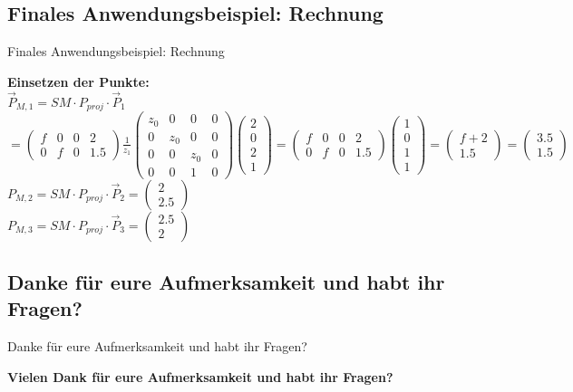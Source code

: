 \documentclass[10pt,aspectratio=169]{beamer}
\begin{document}
  \subsection{Finales Anwendungsbeispiel: Rechnung}
  \begin{frame}{Finales Anwendungsbeispiel: Rechnung}
    
      \textbf{Einsetzen der Punkte:}\\
      $\vec{P}_{M, 1} = SM \cdot P_{proj} \cdot \vec{P}_1$$= \begin{pmatrix}
        f & 0 & 0 & 2\\
        0 & f & 0 & 1.5
      \end{pmatrix}
      \frac{1}{z_1}
      \begin{pmatrix}
        z_0 & 0 & 0 & 0\\
        0 & z_0 & 0 & 0\\
        0 & 0 & z_0 & 0\\
        0 & 0 & 1 & 0
      \end{pmatrix}
      \begin{pmatrix}
        2\\0\\2\\1
      \end{pmatrix}
      =
      \begin{pmatrix}
        f & 0 & 0 & 2\\
        0 & f & 0 & 1.5
      \end{pmatrix}
      \begin{pmatrix}
        1\\0\\1\\1
      \end{pmatrix}
      = \begin{pmatrix}
        f + 2\\1.5
      \end{pmatrix}
      = \begin{pmatrix}
        3.5\\
        1.5
      \end{pmatrix}
      $\\
      $P_{M,2} = SM \cdot P_{proj} \cdot \vec{P}_2 = \begin{pmatrix}
        2\\2.5
      \end{pmatrix}$\\\vspace{0.2cm}
      $P_{M,3} = SM \cdot P_{proj} \cdot \vec{P}_3 = \begin{pmatrix}
        2.5\\2
      \end{pmatrix}$
  \end{frame}

  \subsection{Danke für eure Aufmerksamkeit und habt ihr Fragen?}
  \begin{frame}{Danke für eure Aufmerksamkeit und habt ihr Fragen?}
    \begin{center}
      \textbf{Vielen Dank für eure Aufmerksamkeit und habt ihr Fragen?}
    \end{center}
  \end{frame}
\end{document}
